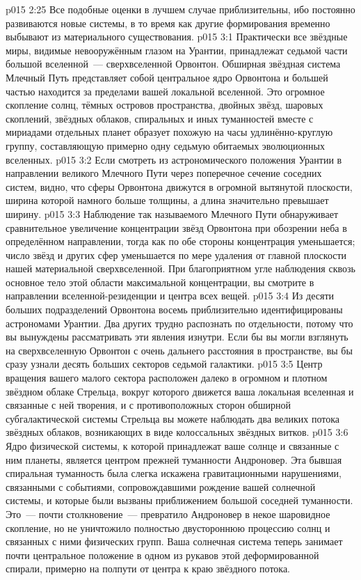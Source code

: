 \vs p015 2:25 \pc Все подобные оценки в лучшем случае приблизительны, ибо постоянно развиваются новые системы, в то время как другие формирования временно выбывают из материального существования.
\vs p015 3:1 Практически все звёздные миры, видимые невооружённым глазом на Урантии, принадлежат седьмой части большой вселенной~--- сверхвселенной Орвонтон. Обширная звёздная система Млечный Путь представляет собой центральное ядро Орвонтона и большей частью находится за пределами вашей локальной вселенной. Это огромное скопление солнц, тёмных островов пространства, двойных звёзд, шаровых скоплений, звёздных облаков, спиральных и иных туманностей вместе с мириадами отдельных планет образует похожую на часы удлинённо\hyp{}круглую группу, составляющую примерно одну седьмую обитаемых эволюционных вселенных.
\vs p015 3:2 Если смотреть из астрономического положения Урантии в направлении великого Млечного Пути через поперечное сечение соседних систем, видно, что сферы Орвонтона движутся в огромной вытянутой плоскости, ширина которой намного больше толщины, а длина значительно превышает ширину.
\vs p015 3:3 Наблюдение так называемого Млечного Пути обнаруживает сравнительное увеличение концентрации звёзд Орвонтона при обозрении неба в определённом направлении, тогда как по обе стороны концентрация уменьшается; число звёзд и других сфер уменьшается по мере удаления от главной плоскости нашей материальной сверхвселенной. При благоприятном угле наблюдения сквозь основное тело этой области максимальной концентрации, вы смотрите в направлении вселенной\hyp{}резиденции и центра всех вещей.
\vs p015 3:4 \pc Из десяти больших подразделений Орвонтона восемь приблизительно идентифицированы астрономами Урантии. Два других трудно распознать по отдельности, потому что вы вынуждены рассматривать эти явления изнутри. Если бы вы могли взглянуть на сверхвселенную Орвонтон с очень дальнего расстояния в пространстве, вы бы сразу узнали десять больших секторов седьмой галактики.
\vs p015 3:5 Центр вращения вашего малого сектора расположен далеко в огромном и плотном звёздном облаке Стрельца, вокруг которого движется ваша локальная вселенная и связанные с ней творения, и с противоположных сторон обширной субгалактической системы Стрельца вы можете наблюдать два великих потока звёздных облаков, возникающих в виде колоссальных звёздных витков.
\vs p015 3:6 Ядро физической системы, к которой принадлежат ваше солнце и связанные с ним планеты, является центром прежней туманности Андроновер. Эта бывшая спиральная туманность была слегка искажена гравитационными нарушениями, связанными с событиями, сопровождавшими рождение вашей солнечной системы, и которые были вызваны приближением большой соседней туманности. Это~--- почти столкновение~--- превратило Андроновер в некое шаровидное скопление, но не уничтожило полностью двустороннюю процессию солнц и связанных с ними физических групп. Ваша солнечная система теперь занимает почти центральное положение в одном из рукавов этой деформированной спирали, примерно на полпути от центра к краю звёздного потока.
